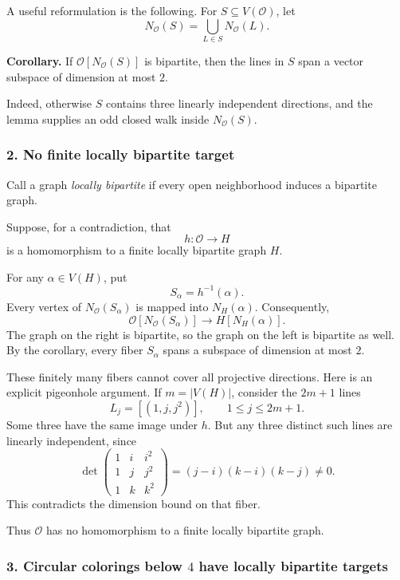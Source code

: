 \documentclass[
  11pt,
  a4paper,
]{article}
\begin{document}
A useful reformulation is the following. For
\(S\subseteq V(\mathcal O)\), let \[
N_{\mathcal O}(S)=\bigcup_{L\in S}N_{\mathcal O}(L).
\]

\textbf{Corollary.} If \(\mathcal O[N_{\mathcal O}(S)]\) is bipartite,
then the lines in \(S\) span a vector subspace of dimension at most
\(2\).

Indeed, otherwise \(S\) contains three linearly independent directions,
and the lemma supplies an odd closed walk inside \(N_{\mathcal O}(S)\).

\subsubsection{2. No finite locally bipartite
target}\label{no-finite-locally-bipartite-target}

Call a graph \emph{locally bipartite} if every open neighborhood induces
a bipartite graph.

Suppose, for a contradiction, that \[
h:\mathcal O\longrightarrow H
\] is a homomorphism to a finite locally bipartite graph \(H\).

For any \(\alpha\in V(H)\), put \[
S_\alpha=h^{-1}(\alpha).
\] Every vertex of \(N_{\mathcal O}(S_\alpha)\) is mapped into
\(N_H(\alpha)\). Consequently, \[
\mathcal O[N_{\mathcal O}(S_\alpha)]
\longrightarrow H[N_H(\alpha)].
\] The graph on the right is bipartite, so the graph on the left is
bipartite as well. By the corollary, every fiber \(S_\alpha\) spans a
subspace of dimension at most \(2\).

These finitely many fibers cannot cover all projective directions. Here
is an explicit pigeonhole argument. If \(m=|V(H)|\), consider the
\(2m+1\) lines \[
L_j=[(1,j,j^2)],\qquad 1\le j\le 2m+1.
\] Some three have the same image under \(h\). But any three distinct
such lines are linearly independent, since \[
\det
\begin{pmatrix}
1&i&i^2\\
1&j&j^2\\
1&k&k^2
\end{pmatrix}
=(j-i)(k-i)(k-j)\ne0.
\] This contradicts the dimension bound on that fiber.

Thus \(\mathcal O\) has no homomorphism to a finite locally bipartite
graph.

\subsubsection{\texorpdfstring{3. Circular colorings below \(4\) have
locally bipartite
targets}{3. Circular colorings below 4 have locally bipartite targets}}\label{circular-colorings-below-4-have-locally-bipartite-targets}
\end{document}
